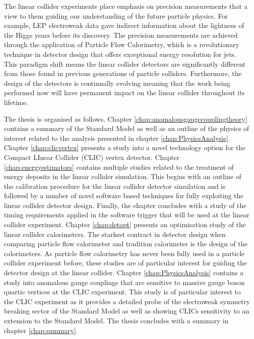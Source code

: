 The linear collider experiments place emphasis on precision measurements that a view to them guiding our understanding of the future particle physics.  For example, LEP electroweak data gave indirect information about the lightness of the Higgs years before its discovery.  The precision measurements are achieved through the application of Particle Flow Calorimetry, which is a revolutionary technique in detector design that offers exceptional energy resolution for jets.  This paradigm shift means the linear collider detectors are significantly different from those found in previous generations of particle colliders.  Furthermore, the design of the detectors is continually evolving meaning that the work being performed now will have permanent impact on the linear collider throughout its lifetime.

The thesis is organised as follows.  Chapter \ref{chap:anomalousgaugecouplingtheory} contains a summary of the Standard Model as well as an outline of the physics of interest related to the analysis presented in chapter \ref{chap:PhysicsAnalysis}.  Chapter \ref{chap:clicvertex} presents a study into a novel technology option for the Compact LInear Collider (CLIC) vertex detector.  Chapter \ref{chap:energyestimators} contains multiple studies related to the treatment of energy deposits in the linear collider simulation.  This begins with an outline of the calibration procedure for the linear collider detector simulation and is followed by a number of novel software based techniques for fully exploiting the linear collider detector design.  Finally, the chapter concludes with a study of the timing requirements applied in the software trigger that will be used at the linear collider experiment.  Chapter \ref{chap:detopt} presents an optimisation study of the linear collider calorimeters.  The starkest contract in detector design when comparing particle flow calorimeter and tradition calorimeter is the design of the calorimeters.  As particle flow calorimetry has never been fully used in a particle collider experiment before, these studies are of particular interest for guiding the detector design at the linear collider.  Chapter \ref{chap:PhysicsAnalysis} contains a study into anomalous gauge couplings that are sensitive to massive gauge boson quartic vertices at the CLIC experiment.  This study is of particular interest to the CLIC experiment as it provides a detailed probe of the electroweak symmetry breaking sector of the Standard Model as well as showing CLICs sensitivity to an extension to the Standard Model.  The thesis concludes with a summary in chapter \ref{chap:summary}.


